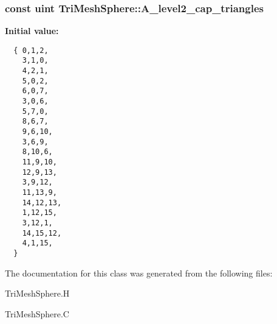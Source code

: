 \subsubsection{\setlength{\rightskip}{0pt plus 5cm}const uint Tri\-Mesh\-Sphere::A\_\-level2\_\-cap\_\-triangles\hspace{0.3cm}{\tt  [static, private]}}\label{classASCbase_1_1geometry_1_1TriMeshSphere_58db5fd91484c9fd014384310be33341}


\textbf{Initial value:}

\begin{Code}\begin{verbatim} 
  { 0,1,2,
    3,1,0,
    4,2,1,
    5,0,2,
    6,0,7,
    3,0,6,
    5,7,0,
    8,6,7,
    9,6,10,
    3,6,9,
    8,10,6,
    11,9,10,
    12,9,13,
    3,9,12,
    11,13,9,
    14,12,13,
    1,12,15,
    3,12,1,
    14,15,12,
    4,1,15,
  }
\end{verbatim}\end{Code}


The documentation for this class was generated from the following files:\begin{CompactItemize}
\item 
Tri\-Mesh\-Sphere.H\item 
Tri\-Mesh\-Sphere.C\end{CompactItemize}
